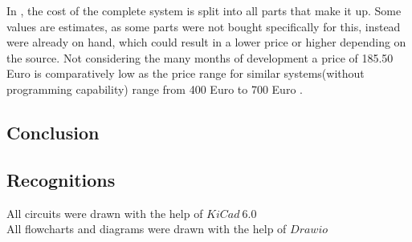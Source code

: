 \noindent In , the cost of the complete system is split into all parts that make it up. Some values are estimates, as some parts were not bought specifically for this, instead were already on hand, which could result in a lower price or higher depending on the source. Not considering the many months of development a price of 185.50 Euro is comparatively low as the price range for similar systems(without programming capability) range from 400 Euro  to 700 Euro . \\

\subsection{Conclusion}


\pagebreak

\subsection{Recognitions}
\label{Recognitions}
All circuits were drawn with the help of $KiCad\ 6.0$\\

\noindent All flowcharts and diagrams were drawn with the help of $Drawio$